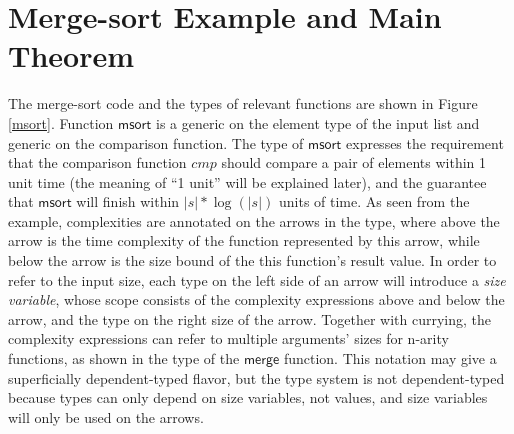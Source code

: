 \documentclass[preprint]{sigplanconf}
\newcommand{\symmerge}{\mathsf{merge}}
\newcommand{\symmsort}{\mathsf{msort}}
\begin{document}
\section{\label{section-example}Merge-sort Example and Main Theorem}

The merge-sort code and the types of relevant functions are shown in Figure \ref{msort}. Function $\symmsort$ is a generic on the element type of the input list and generic on the comparison function. The type of $\symmsort$ expresses the requirement that the comparison function $cmp$ should compare a pair of elements within 1 unit time (the meaning of ``1 unit'' will be explained later), and the guarantee that $\symmsort$ will finish within $|s|*\log(|s|)$ units of time. As seen from the example, complexities are annotated on the arrows in the type, where above the arrow is the time complexity of the function represented by this arrow, while below the arrow is the size bound of the this function's result value. In order to refer to the input size, each type on the left side of an arrow will introduce a \emph{size variable}, whose scope consists of the complexity expressions above and below the arrow, and the type on the right size of the arrow. Together with currying, the complexity expressions can refer to multiple arguments' sizes for n-arity functions, as shown in the type of the $\symmerge$ function. This notation may give a superficially dependent-typed flavor, but the type system is not dependent-typed because types can only depend on size variables, not values, and size variables will only be used on the arrows.
\end{document}
